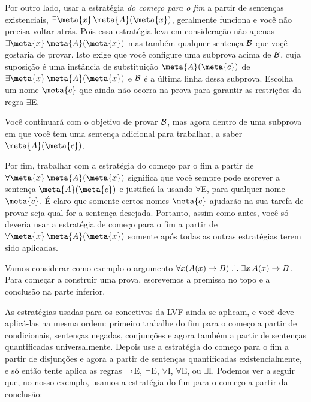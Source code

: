 Por outro lado, usar a estrat\'egia \emph{do come\c co para o fim} a partir de senten\c cas existenciais,  $\exists \meta{x}\, \atom{\meta{A}}{\meta{x}}$, geralmente funciona e voc\^e n\~ao precisa voltar atr\'as. Pois essa estrat\'egia  leva em considera\c c\~ao n\~ao apenas
 $\exists \meta{x}\, \atom{\meta{A}}{\meta{x}}$  mas tamb\'em qualquer senten\c ca $\mathcal{B}$ que vo\c c\^e gostaria de provar. Isto exige que voc\^e configure uma subprova acima de $\mathcal{B}$, cuja suposi\c c\~ao \'e uma inst\^ancia de substitui\c c\~ao $\atom{\meta{A}}{\meta{c}}$ de $\exists \meta{x}\, \atom{\meta{A}}{\meta{x}}$ e $\mathcal{B}$  \'e a \'ultima linha dessa subprova. Escolha um nome $\meta{c}$ que ainda n\~ao ocorra na prova para garantir as restri\c c\~oes da regra $\exists$E.
 
\begin{fitchproof}
	\ellipsesline
	\ellipsesline
	\open
	\ellipsesline
	\close
\end{fitchproof}
Voc\^e continuar\'a com o objetivo de provar $\mathcal{B}$, mas agora dentro de uma subprova em que voc\^e tem uma senten\c ca adicional para trabalhar, a saber~$\atom{\meta{A}}{\meta{c}}$.

Por fim, trabalhar com a estrat\'egia do come\c co par o fim a partir de $\forall \meta{x}\, \atom{\meta{A}}{\meta{x}}$ significa que voc\^e sempre pode escrever a senten\c ca $\atom{\meta{A}}{\meta{c}}$ e justific\'a-la usando $\forall$E, para qualquer nome~$\meta{c}$.  \'E claro que somente certos nomes $\meta{c}$ ajudar\~ao na sua tarefa de provar seja qual for a senten\c ca desejada. Portanto, assim como antes, voc\^e s\'o deveria  usar a estrat\'egia de come\c co para o fim a partir de  $\forall \meta{x}\, \atom{\meta{A}}{\meta{x}}$ somente ap\'os todas as outras estrat\'egias terem sido aplicadas.

Vamos considerar como exemplo o argumento $\forall x(\mathord{A}(x) \rightarrow B) \mathrel{\ldotp\dot{}\,\ldotp} \exists x\,\mathord{A}(x) \rightarrow B$. Para come\c car a construir uma prova, escrevemos a premissa no topo e a conclus\~ao na parte inferior.
\begin{fitchproof}
\ellipsesline
{}
\end{fitchproof}
As estrat\'egias usadas para os conectivos da LVF ainda se aplicam, e voc\^e deve aplic\'a-las na mesma ordem: primeiro trabalhe do fim para o come\c co a partir de condicionais, senten\c cas negadas, conjun\c c\~oes e agora tamb\'em a partir de  senten\c cas quantificadas universalmente. Depois use a estrat\'egia do come\c co para o fim a partir de  disjun\c c\~oes e agora a partir de senten\c cas quantificadas existencialmente, e s\'o ent\~ao tente aplica as regras $\rightarrow$E, $\neg$E, $\lor$I, $\forall$E, ou $\exists$I. Podemos ver a seguir que, no nosso exemplo, usamos a estrat\'egia do fim para o come\c co a partir da conclus\~ao:
 
